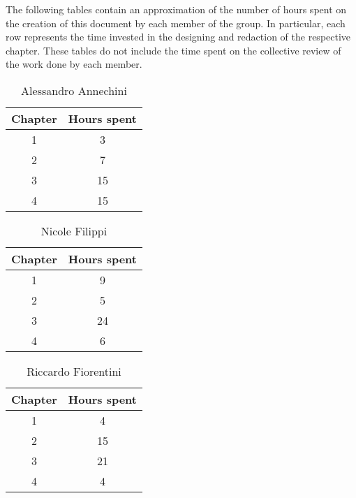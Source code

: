 The following tables contain an approximation of the number of hours spent on the creation of this document by each member of the group. In particular, each row represents the time invested in the designing and redaction of the respective chapter. These tables do not include the time spent on the collective review of the work done by each member.


\begin{table}[h!]
  \centering
  \begin{tabular}{|c|c|}
    \hline
    Chapter & Hours spent \\
    \hline
    1 & 3\\
    \hline
    2 & 7\\
    \hline
    3 & 15\\
    \hline
    4 & 15\\
    \hline
  \end{tabular}
  \caption{Alessandro Annechini}
  \label{tab:Alessandro_Annechini_hours}
\end{table}

\begin{table}[h!]
  \centering
  \begin{tabular}{|c|c|}
    \hline
    Chapter & Hours spent \\
    \hline
    1 & 9\\
    \hline
    2 & 5\\
    \hline
    3 & 24\\
    \hline
    4 & 6\\
    \hline
  \end{tabular}
  \caption{Nicole Filippi}
  \label{tab:Nicole_Filippi_hours}
\end{table}

\begin{table}[h!]
  \centering
  \begin{tabular}{|c|c|}
    \hline
    Chapter & Hours spent \\
    \hline
    1 & 4\\
    \hline
    2 & 15\\
    \hline
    3 & 21\\
    \hline
    4 & 4\\
    \hline
  \end{tabular}
  \caption{Riccardo Fiorentini}
  \label{tab:Riccardo_Fiorentini_hours}
\end{table}